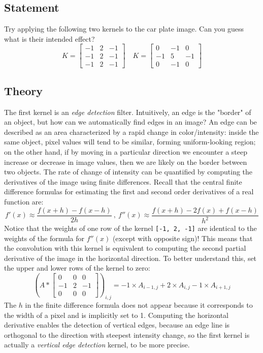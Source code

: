 \documentclass{article}
\newcommand{\py}[1]{\texttt{\lstinline!#1!}}
\begin{document}
\subsection{Statement}
Try applying the following two kernels to the car plate image. Can you guess what is their intended effect?
\begin{equation*}
    K = \begin{bmatrix}
    -1 & 2 & -1 \\
    -1 & 2 & -1 \\
    -1 & 2 & -1
    \end{bmatrix} \quad
    K = \begin{bmatrix}
     0 & -1 &  0 \\
    -1 &  5 & -1 \\
     0 & -1 &  0
    \end{bmatrix}
\end{equation*}

\subsection{Theory}
The first kernel is an \emph{edge detection} filter. Intuitively, an edge is the "border" of an object, but how can we automatically find edges in an image? An edge can be described as an area characterized by a rapid change in color/intensity: inside the same object, pixel values will tend to be similar, forming uniform-looking region; on the other hand, if by moving in a particular direction we encounter a steep increase or decrease in image values, then we are likely on the border between two objects.
The rate of change of intensity can be quantified by computing the derivatives of the image using finite differences. Recall that the central finite difference formulas for estimating the first and second order derivatives of a real function are:
\begin{equation*}
    f'(x) \approx \frac{f(x+h)-f(x-h)}{2h} \ , \ f''(x) \approx \frac{f(x+h) - 2f(x) + f(x-h)}{h^2}
\end{equation*}
Notice that the weights of one row of the kernel \py{[-1, 2, -1]} are identical to the weights of the formula for $f''(x)$ (except with opposite sign)! This means that the convolution with this kernel is equivalent to computing the second partial derivative of the image in the horizontal direction. To better understand this, set the upper and lower rows of the kernel to zero:
\begin{equation*}
    \left( A *  \begin{bmatrix}
    0 & 0 & 0 \\
    -1 & 2 & -1 \\
    0 & 0 & 0 \end{bmatrix}\right)_{i, j} =
   -1 \times A_{i - 1, j} + 2 \times A_{i, j} -1 \times A_{i + 1, j}
\end{equation*}
The $h$ in the finite difference formula does not appear because it corresponds to the width of a pixel and is implicitly set to 1. Computing the horizontal derivative enables the detection of vertical edges, because an edge line is orthogonal to the direction with steepest intensity change, so the first kernel is actually a \emph{vertical edge detection} kernel, to be more precise.
\end{document}
